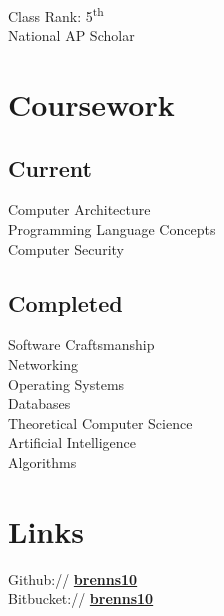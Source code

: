 \documentclass[letterpaper]{deedy-resume} %
\begin{document}
\begin{minipage}[t]{0.33\textwidth}
Class Rank: 5\textsuperscript{th} \\
National AP Scholar \\

\sectionspace %


\section{Coursework}

\subsection{Current}

Computer Architecture \\
Programming Language Concepts \\
Computer Security

\sectionspace %


\subsection{Completed}

Software Craftsmanship \\
Networking \\
Operating Systems \\
Databases \\
Theoretical Computer Science \\
Artificial Intelligence \\
Algorithms


\sectionspace %


\section{Links}

Github:// \href{https://github.com/brenns10}{\bf brenns10} \\
Bitbucket:// \href{https://bitbucket.org/brenns10}{\bf brenns10} \\


\end{minipage}
\end{document}
